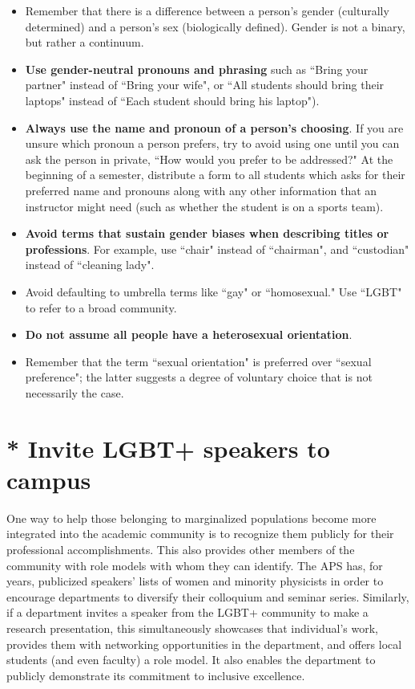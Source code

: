 \begin{itemize}
	\item Remember that there is a difference between a person's gender (culturally determined) and a person's sex (biologically defined). Gender is not a binary, but rather a continuum.
	\item \textbf{Use gender-neutral pronouns and phrasing} such as ``Bring your partner" instead of ``Bring your wife", or ``All students should bring their laptops" instead of ``Each student should bring his laptop").
	\item \textbf{Always use the name and pronoun of a person's choosing}. If you are unsure which pronoun a person prefers, try to avoid using one until you can ask the person in private, ``How would you prefer to be addressed?" At the beginning of a semester, distribute a form to all students which asks for their preferred name and pronouns along with any other information that an instructor might need (such as whether the student is on a sports team).
	\item \textbf{Avoid terms that sustain gender biases when describing titles or professions}. For example, use ``chair" instead of ``chairman", and ``custodian" instead of ``cleaning lady".
	\item Avoid defaulting to umbrella terms like ``gay" or ``homosexual." Use ``LGBT" to refer to a broad community.
	\item \textbf{Do not assume all people have a heterosexual orientation}.
	\item Remember that the term ``sexual orientation" is preferred over ``sexual preference"; the latter suggests a degree of voluntary choice that is not necessarily the case.
\end{itemize}

\section {* Invite LGBT+ speakers to campus}
\label{lgbt-speakers}
One way to help those belonging to marginalized populations become more integrated into the academic community is to recognize them publicly for their professional accomplishments. This also provides other members of the community with role models with whom they can identify. The APS has, for years, publicized speakers' lists of women and minority physicists in order to encourage departments to diversify their colloquium and seminar series. Similarly, if a department invites a speaker from the LGBT+ community to make a research presentation, this simultaneously showcases that individual's work, provides them with networking opportunities in the department, and offers local students (and even faculty) a role model. It also enables the department to publicly demonstrate its commitment to inclusive excellence.

